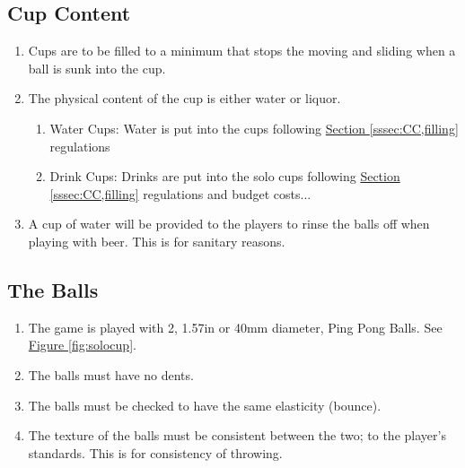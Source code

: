	\subsection{Cup Content}\label{ssec:CupContent}
        \begin{enumerate}[label=(\roman*)]
            \item \label{sssec:CC,filling} Cups are to be filled to a minimum that stops the moving and sliding when a ball is sunk into the cup. 
            \item \label{sssec:CC,w_vs_l} The physical content of the cup is either water or liquor.
                \begin{enumerate}[label=(\alph*), leftmargin=2cm]
                    \item Water Cups: Water is put into the cups following \hyperref[sssec:CC,filling]{Section \ref{sssec:CC,filling}} regulations
                    \item Drink Cups: Drinks are put into the solo cups following \hyperref[sssec:CC,filling]{Section \ref{sssec:CC,filling}} regulations and budget costs...
                \end{enumerate} 
            \item \label{sssec:CC,rinse} A cup of water will be provided to the players to rinse the balls off when playing with beer. This is for sanitary reasons. 
        \end{enumerate}        
    \subsection{The Balls}\label{ssec:Balls}
        \begin{enumerate}[label=(\roman*)]
            \item \label{sssec:Balls,num} The game is played with 2, 1.57in or 40mm diameter, Ping Pong Balls. See \hyperref[fig:solocup]{Figure \ref{fig:solocup}}.
            \item \label{sssec:Balls,dents} The balls must have no dents. 
            \item \label{sssec:Balls,bounce} The balls must be checked to have the same elasticity (bounce). 
            \item \label{sssec:Balls,texture} The texture of the balls must be consistent between the two; to the player's standards. This is for consistency of throwing. 
        \end{enumerate}    
